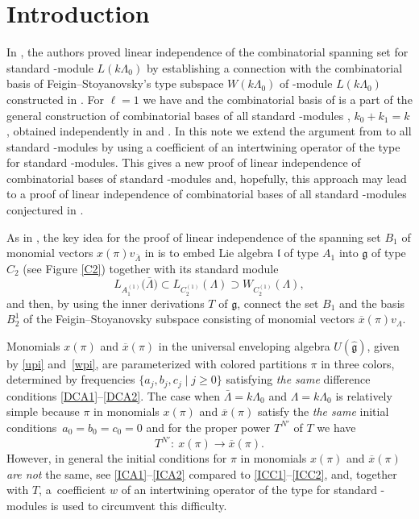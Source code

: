 \documentclass[pdftex]{sigma}
\newcommand{\lgg}
{{\mathfrak l}}
\newcommand{\ox}
{{\overline{x}}}
\numberwithin{equation}{section}
\begin{document}
\section{Introduction}

In \cite{PT}, the authors proved linear independence of the combinatorial spanning set for standard -module $L(k\Lambda_0)$ by establishing a connection with the combinatorial basis of Feigin--Stoyanovsky's type subspace $W(k\Lambda_0)$ of -module $L(k\Lambda_0)$ constructed in \cite{BPT}. For $\ell=1$ we have  and the combinatorial basis of  is a part of the general construction of combinatorial bases of all standard -modules , $k_0+k_1=k$, obtained independently in \cite{MP} and \cite{FKLMM}.
In this note we extend the argument from \cite{PT} to all standard -modules by using a coefficient of an intertwining operator of the type  for standard -modules. This gives a new proof of linear independence of combinatorial bases of standard -modules and, hopefully, this approach may lead to a proof of linear independence of combinatorial bases of all standard -modules conjectured in \cite{CMPP}.

As in \cite{PT}, the key idea for the proof of linear independence of the spanning set $B_1$ of monomial vectors $x(\pi)v_{\bar\Lambda}$ in  is to embed Lie algebra $\lgg$ of type $A_1$ into ${\mathfrak g}$ of type $C_{2}$ (see Figure \ref{C2}) together with its standard module
\[
L_{A_{1}^{(1)}}\bigl(\bar{\Lambda}\bigr)\subset L_{C_{2}^{(1)}}(\Lambda)
\supset W_{C_{2}^{(1)}}(\Lambda),
\]
and then, by using the inner derivations $T$ of ${\mathfrak g}$, connect the set $B_1$ and
the basis $B_2^1$ of the Feigin--Stoyanovsky subspace  consisting of monomial vectors $\ox(\pi)v_{\Lambda}$.

Monomials $x(\pi)$ and $\ox(\pi)$ in the universal enveloping algebra $U(\hat{\mathfrak g})$, given by \eqref{upi} and~\eqref{wpi}, are parameterized with colored partitions $\pi$ in three colors, determined by frequencies $\{a_j, b_j, c_j\mid j\geq0\}$ satisfying {\it the same} difference conditions \eqref{DCA1}--\eqref{DCA2}. The case when $\bar\Lambda=k\Lambda_0$ and $\Lambda=k\Lambda_0$ is relatively simple because $\pi$ in monomials $x(\pi)$ and $\ox(\pi)$ satisfy the {\it the same} initial conditions~${a_0=b_0=c_0=0}$ and for the proper power $T^{N'}$ of $T$ we have
\[
T^{N'}\colon\ x(\pi)\to \ox(\pi).
\]
However, in general the initial conditions for $\pi$ in monomials $x(\pi)$ and $\ox(\pi)$ {\it are not} the same, see \eqref{ICA1}--\eqref{ICA2} compared to \eqref{ICC1}--\eqref{ICC2}, and, together with $T$, a~coefficient $w$ of an intertwining operator of the type  for standard -modules is used to circumvent this difficulty.
\end{document}
